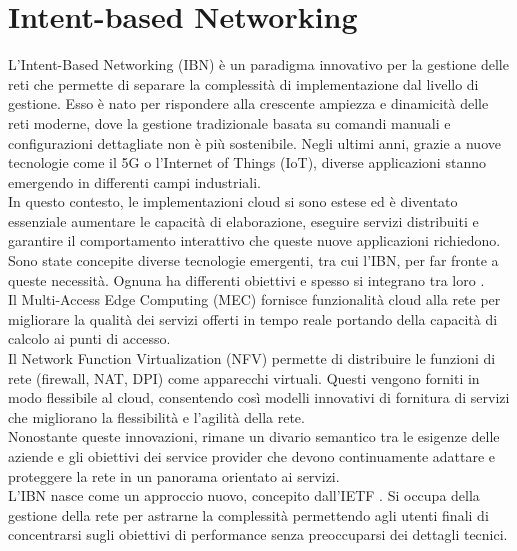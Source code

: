 \section{Intent-based Networking}
\label{ch:IBN}
L'Intent-Based Networking (IBN) è un paradigma innovativo per la gestione delle reti che permette di separare la complessità di implementazione dal livello di gestione.
Esso è nato per rispondere alla crescente ampiezza e dinamicità delle reti moderne, dove la gestione tradizionale basata su comandi manuali e configurazioni dettagliate non è più sostenibile.
Negli ultimi anni, grazie a nuove tecnologie come il 5G o l'Internet of Things (IoT), diverse applicazioni stanno emergendo in differenti campi industriali.
\\In questo contesto, le implementazioni cloud si sono estese ed è diventato essenziale aumentare le capacità di elaborazione, eseguire servizi distribuiti e garantire il 
comportamento interattivo che queste nuove applicazioni richiedono.
\\Sono state concepite diverse tecnologie emergenti, tra cui l'IBN, per far fronte a queste necessità. Ognuna ha differenti obiettivi e spesso si integrano tra loro \cite{ibn}.
\\Il Multi-Access Edge Computing\cite{mec} (MEC) fornisce funzionalità cloud alla rete per migliorare la qualità dei servizi offerti in tempo reale portando della capacità di calcolo ai punti di accesso.
\\Il Network Function Virtualization\cite{nfv} (NFV) permette di distribuire le funzioni di rete (firewall, NAT, DPI) come apparecchi virtuali. Questi vengono forniti in modo flessibile al cloud, consentendo 
così modelli innovativi di fornitura di servizi che migliorano la flessibilità e l'agilità della rete.
\\Nonostante queste innovazioni, rimane un divario semantico tra le esigenze delle aziende e gli obiettivi dei service provider che devono continuamente adattare e proteggere la rete in un panorama orientato ai servizi.
\\L'IBN nasce come un approccio nuovo, concepito dall'IETF \cite{ietf}. Si occupa della gestione della rete per astrarne la complessità permettendo agli utenti finali di concentrarsi sugli obiettivi di performance senza preoccuparsi dei dettagli tecnici.
